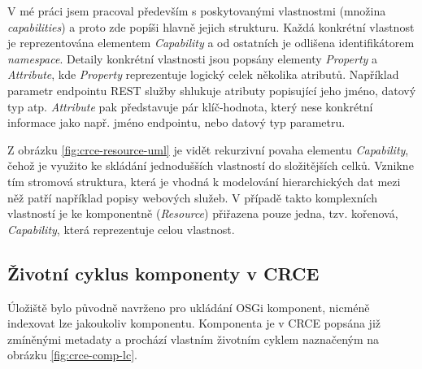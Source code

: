 \documentclass[czech,DP]{thesiskiv}
\begin{document}
V mé práci jsem pracoval především s poskytovanými vlastnostmi (množina \textit{capabilities}) a proto zde popíši hlavně jejich strukturu. Každá konkrétní vlastnost je reprezentována elementem \textit{Capability} a od ostatních je odlišena identifikátorem \textit{namespace}. Detaily konkrétní vlastnosti jsou popsány elementy \textit{Property} a \textit{Attribute}, kde \textit{Property} reprezentuje logický celek několika atributů. Například parametr endpointu REST služby shlukuje atributy popisující jeho jméno, datový typ atp. \textit{Attribute} pak představuje pár klíč-hodnota, který nese konkrétní informace jako např. jméno endpointu, nebo datový typ parametru.

Z obrázku \ref{fig:crce-resource-uml} je vidět rekurzivní povaha elementu \textit{Capability}, čehož je využito ke skládání jednodušších vlastností do složitějších celků. Vznikne tím stromová struktura, která je vhodná k modelování hierarchických dat mezi něž patří například popisy webových služeb. V případě takto komplexních vlastností je ke komponentně (\textit{Resource}) přiřazena pouze jedna, tzv. kořenová, \textit{Capability}, která reprezentuje celou vlastnost.


\subsection{Životní cyklus komponenty v CRCE}

Úložiště bylo původně navrženo pro ukládání OSGi komponent, nicméně indexovat lze jakoukoliv komponentu. Komponenta je v CRCE popsána již zmíněnými metadaty a prochází vlastním životním cyklem naznačeným na obrázku \ref{fig:crce-comp-lc}.
\end{document}
